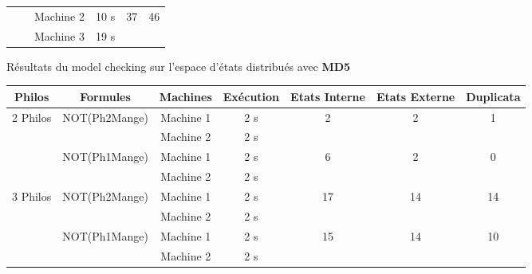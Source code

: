\begin{tableth}
\begin{tabular}{|c|c|c||c||c|c|  }
		                          &                                      & Machine 2 &       10 s        & \multirow{2}{*}{37 } & \multirow{2}{*}{46 } \\ \cline{3-4}
		                          &                                      & Machine 3 &       19 s        &                      &                      \\ \hline\hline
	\end{tabular}
	\caption{Résultats du model checking sur l'espace d'états distribués avec \textbf{MD5} }\label{tablea1}
\end{tableth}

\begin{tableth}
	\centering
	\begin{tabular}{|c|c|c||c||c|c|c|}
		\hline
		         Philos           &                Formules                & Machines  & Exécution &    Etats Interne    &    Etats Externe    &      Duplicata      \\ \hline
		\multirow{4}{*}{2 Philos} & \multirow{2}{*}{{\tiny NOT(Ph2Mange)}} & Machine 1 &    2 s    & \multirow{2}{*}{2}  & \multirow{2}{*}{2}  & \multirow{2}{*}{1}  \\ \cline{3-4}
		                          &                                        & Machine 2 &    2 s    &                     &                     &                     \\ \cline{2-4}\cline{4-7}
		                          &  \multirow{2}{*}{\tiny NOT(Ph1Mange)}  & Machine 1 &    2 s    & \multirow{2}{*}{6}  & \multirow{2}{*}{2}  & \multirow{2}{*}{0}  \\ \cline{3-4}
		                          &                                        & Machine 2 &    2 s    &                     &                     &                     \\ \hline\hline
		\multirow{4}{*}{3 Philos} &  \multirow{2}{*}{\tiny NOT(Ph2Mange)}  & Machine 1 &    2 s    & \multirow{2}{*}{17} & \multirow{2}{*}{14} & \multirow{2}{*}{14} \\ \cline{3-4}
		                          &                                        & Machine 2 &    2 s    &                     &                     &                     \\ \cline{2-4}\cline{4-7}
		                          &  \multirow{2}{*}{\tiny NOT(Ph1Mange)}  & Machine 1 &    2 s    & \multirow{2}{*}{15} & \multirow{2}{*}{14} & \multirow{2}{*}{10} \\ \cline{3-4}
		                          &                                        & Machine 2 &    2 s    &                     &                     &                     \\ \hline\hline

\end{tabular}
\end{tableth}
